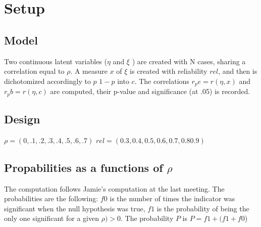 \documentclass{article}
\begin{document}
\section*{Setup}
\subsection*{Model}
Two continuous latent variables (\(\eta\) and \(\xi\) ) are created with N cases, sharing a correlation equal to \(\rho\). A measure \(x\) of \(\xi\) is created with reliability \(rel\), and then  is dichotomized accordingly to \(p\) \(1-p\) into \(c\). The correlations \( r_pe=r(\eta,x) \)  and \( r_pb=r(\eta,c) \) are computed, their p-value and significance (at .05) is recorded.
\subsection*{Design}
\(\rho=(0,.1,.2,.3,.4,.5,.6,.7) \)
\(rel=(0.3, 0.4 ,0.5, 0.6, 0.7 ,0.8 0.9) \) 

\subsection*{Propabilities as a functions of \(\rho\)}

The computation follows Jamie's computation at the last meeting. The probabilities are the following: \(f0\) is the number of times the indicator was significant when the null hypothesis was true, \(f1\) is the probability of being the only one significant for a given \(\rho)>0\). The probability \(P\) is \(P=f1+(f1+f0\))  
\end{document}
